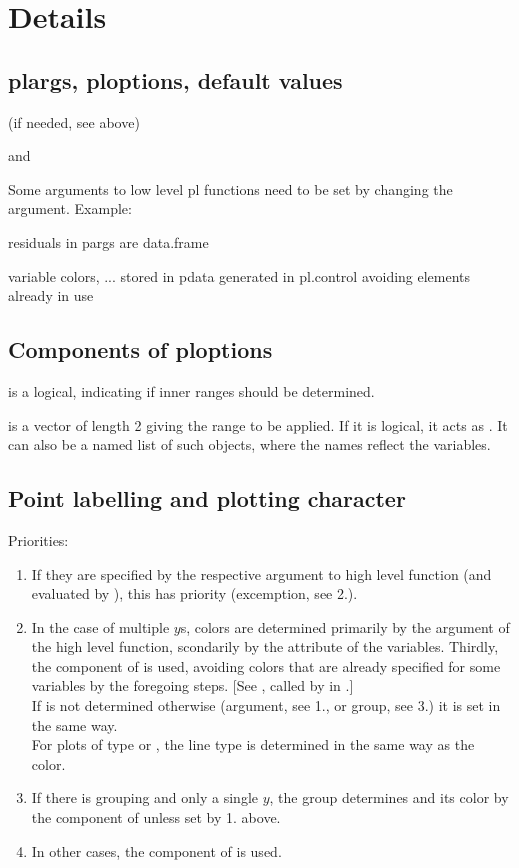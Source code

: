 \documentclass[11pt]{article}\usepackage[]{graphicx}\usepackage[]{color}
\begin{document}
\section{Details}

\subsection{plargs, ploptions, default values} 
(if needed, see above)

 and 

Some arguments to low level pl functions need to be set by changing
the  argument.
Example:

residuals in pargs are data.frame

variable colors, ... stored in pdata
generated in pl.control avoiding elements already in use 

\subsection{Components of ploptions}

 is a logical, indicating if inner ranges
should be determined.

 is a vector of length 2 giving the range to be
applied. If it is logical, it acts as .
It can also be a named list of such objects, where the names reflect the 
variables.

\subsection{Point labelling and plotting character}
Priorities:
\begin{enumerate}
\item 
  If they are specified by the respective argument to high level  
  function (and evaluated by ), this has priority
  (excemption, see 2.).
\item
  In the case of multiple $y$s, colors are determined primarily by 
  the argument  of the high level  function, 
  scondarily by the  attribute of the variables. 
  Thirdly, the  component of  is used,
  avoiding colors that are already specified for some variables by the
  foregoing steps. 
  [See , called by  in 
  .]\\
  If  is not determined otherwise (argument, see 1., or group,
  see 3.) it is set in the same way.\\
  For plots of type  or , the line type  is determined 
  in the same way as the color.
\item
  If there is grouping and only a single $y$, the group determines 
  and its color by the  component of  unless set
  by 1. above.
\item
  In other cases, the  component of  is used.
\end{enumerate}
\end{document}
